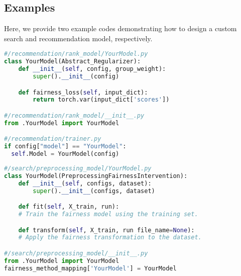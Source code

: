 \subsection{Examples}
Here, we provide two example codes demonstrating how to design a custom search and recommendation model, respectively. 
\begin{lstlisting}[language=Python]
#/recommendation/rank_model/YourModel.py
class YourModel(Abstract_Regularizer):
    def __init__(self, config, group_weight):
        super().__init__(config)

    def fairness_loss(self, input_dict):
        return torch.var(input_dict['scores'])

#/recommendation/rank_model/__init__.py
from .YourModel import YourModel

#/recommendation/trainer.py
if config["model"] == "YourModel":
  self.Model = YourModel(config)
\end{lstlisting}

\begin{lstlisting}[language=Python]
#/search/preprocessing_model/YourModel.py
class YourModel(PreprocessingFairnessIntervention):
    def __init__(self, configs, dataset):
        super().__init__(configs, dataset)

    def fit(self, X_train, run):
    # Train the fairness model using the training set.

    def transform(self, X_train, run file_name=None):
    # Apply the fairness transformation to the dataset.

#/search/preprocessing_model/__init__.py
from .YourModel import YourModel
fairness_method_mapping['YourModel'] = YourModel


\end{lstlisting}







